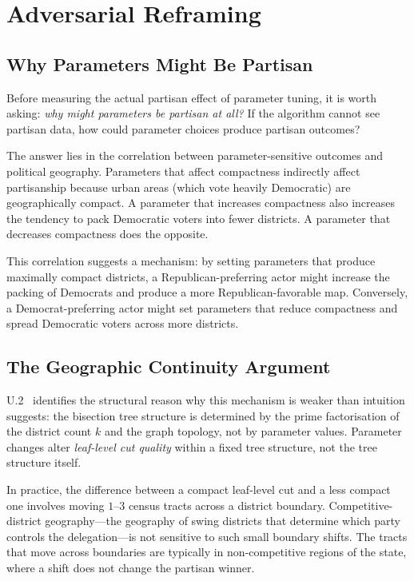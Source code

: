 \section{Adversarial Reframing}
\label{sec:adversarial}

\subsection{Why Parameters Might Be Partisan}

Before measuring the actual partisan effect of parameter tuning, it is
worth asking: \emph{why might parameters be partisan at all?}
If the algorithm cannot see partisan data, how could parameter choices
produce partisan outcomes?

The answer lies in the correlation between parameter-sensitive outcomes
and political geography.
Parameters that affect compactness indirectly affect partisanship because
urban areas (which vote heavily Democratic) are geographically compact.
A parameter that increases compactness also increases the tendency to
pack Democratic voters into fewer districts.
A parameter that decreases compactness does the opposite.

This correlation suggests a mechanism: by setting parameters that produce
maximally compact districts, a Republican-preferring actor might increase
the packing of Democrats and produce a more Republican-favorable map.
Conversely, a Democrat-preferring actor might set parameters that reduce
compactness and spread Democratic voters across more districts.

\subsection{The Geographic Continuity Argument}

U.2~\citep{b17paper} identifies the structural reason why this mechanism
is weaker than intuition suggests: the bisection tree structure is determined
by the prime factorisation of the district count $k$ and the graph topology,
not by parameter values.
Parameter changes alter \emph{leaf-level cut quality} within a fixed tree
structure, not the tree structure itself.

In practice, the difference between a compact leaf-level cut and a less
compact one involves moving $1$--$3$ census tracts across a district
boundary.
Competitive-district geography---the geography of swing districts that
determine which party controls the delegation---is not sensitive to
such small boundary shifts.
The tracts that move across boundaries are typically in non-competitive
regions of the state, where a shift does not change the partisan winner.


